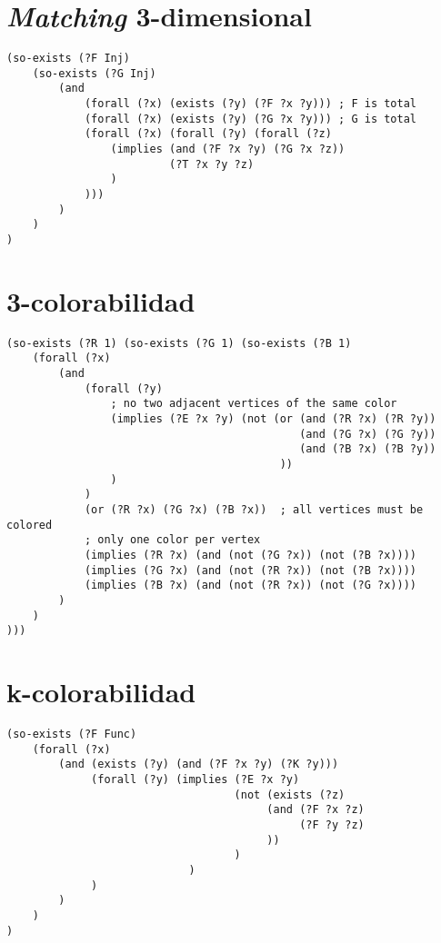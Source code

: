 \section{\textit{Matching} 3-dimensional}
\begin{verbatim}
(so-exists (?F Inj)
    (so-exists (?G Inj)
        (and
            (forall (?x) (exists (?y) (?F ?x ?y))) ; F is total
            (forall (?x) (exists (?y) (?G ?x ?y))) ; G is total
            (forall (?x) (forall (?y) (forall (?z)
                (implies (and (?F ?x ?y) (?G ?x ?z))
                         (?T ?x ?y ?z)
                )
            )))
        )
    )
)
\end{verbatim}

\section{3-colorabilidad}
\begin{verbatim}
(so-exists (?R 1) (so-exists (?G 1) (so-exists (?B 1)
    (forall (?x) 
        (and
            (forall (?y)
                ; no two adjacent vertices of the same color
                (implies (?E ?x ?y) (not (or (and (?R ?x) (?R ?y))
                                             (and (?G ?x) (?G ?y))
                                             (and (?B ?x) (?B ?y))
                                          ))
                )
            )
            (or (?R ?x) (?G ?x) (?B ?x))  ; all vertices must be colored
            ; only one color per vertex
            (implies (?R ?x) (and (not (?G ?x)) (not (?B ?x))))
            (implies (?G ?x) (and (not (?R ?x)) (not (?B ?x))))
            (implies (?B ?x) (and (not (?R ?x)) (not (?G ?x))))
        )
    )
)))
\end{verbatim}

\section{k-colorabilidad}
\begin{verbatim}
(so-exists (?F Func)
    (forall (?x) 
        (and (exists (?y) (and (?F ?x ?y) (?K ?y)))
             (forall (?y) (implies (?E ?x ?y)
                                   (not (exists (?z)
                                        (and (?F ?x ?z)
                                             (?F ?y ?z)
                                        ))
                                   )
                            )
             )
        )
    )
)
\end{verbatim}
